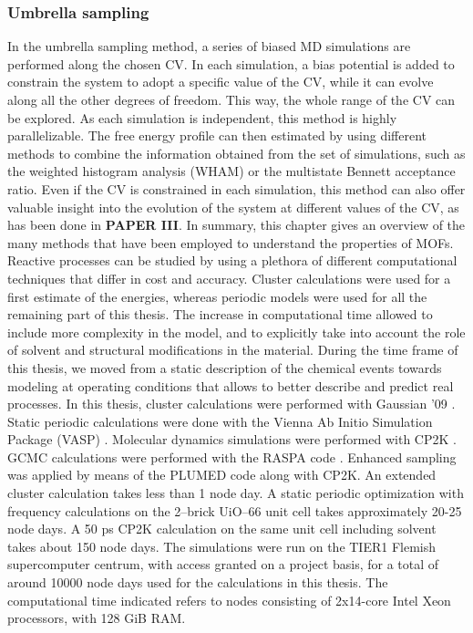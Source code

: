 \subsubsection*{Umbrella sampling}
In the umbrella sampling method, a series of biased MD simulations are performed along the chosen CV. In each simulation, a bias potential is added to constrain the system to adopt a specific value of the CV, while it can evolve along all the other degrees of freedom. This way, the whole range of the CV can be explored. As each simulation is independent, this method is highly parallelizable. The free energy profile can then estimated by using different methods to combine the information obtained from the set of simulations, such as the weighted histogram analysis (WHAM) or the multistate Bennett acceptance ratio\cite{kumar1992weighted, torrie1977nonphysical}. Even if the CV is constrained in each simulation, this method can also offer valuable insight into the evolution of the system at different values of the CV, as has been done in \textbf{PAPER III}.
\npar
\npar
\npar
\npar
\npar
In summary, this chapter gives an overview of the many methods that have been employed to understand the properties of MOFs. Reactive processes can be studied by using a plethora of different computational techniques that differ in cost and accuracy. Cluster calculations were used for a first estimate of the energies, whereas periodic models were used for all the remaining part of this thesis. The increase in computational time allowed to include more complexity in the model, and to explicitly take into account the role of solvent and structural modifications in the material. During the time frame of this thesis, we moved from a static description of the chemical events towards modeling at operating conditions that allows to better describe and predict real processes. 
\npar
In this thesis, cluster calculations were performed with Gaussian '09 \cite{frisch2015gaussian}. Static periodic calculations were done with the Vienna Ab Initio Simulation Package (VASP) \cite{kresse1996efficient, kresse1993ab, kresse1994ab, kresse1996efficiency, kresse1999ultrasoft}. Molecular dynamics simulations were performed with CP2K \cite{vandevondele2005quickstep}. GCMC calculations were performed with the RASPA code \cite{dubbeldam2016raspa}. Enhanced sampling was applied by means of the PLUMED code \cite{tribello2014plumed} along with CP2K. An extended cluster calculation takes less than 1 node day. A static periodic optimization with frequency calculations on the 2--brick UiO--66 unit cell takes approximately 20-25 node days. A 50 ps CP2K calculation on the same unit cell including solvent takes about 150 node days. The simulations were run on the TIER1 Flemish supercomputer centrum, with access granted on a project basis, for a total of around 10000 node days used for the calculations in this thesis. The computational time indicated refers to nodes consisting of 2x14-core Intel Xeon processors, with 128 GiB RAM.

\clearpage{\pagestyle{empty}\cleardoublepage}